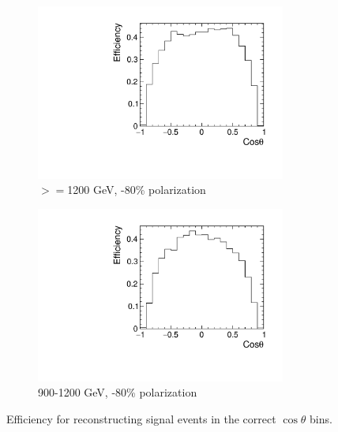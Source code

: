 \begin{figure}
  \centering
  \begin{subfigure}{.5\textwidth}
    \centering
    \includegraphics[width=0.9\textwidth]{TopAnalysis/figures/efficiency_HighE.pdf}
    \caption{$>=$1200 GeV, -80\% polarization}
  \end{subfigure}%
  \begin{subfigure}{.5\textwidth}
    \centering
    \includegraphics[width=0.9\textwidth]{TopAnalysis/figures/efficiency_MidE.pdf}
    \caption{900-1200 GeV, -80\% polarization}
  \end{subfigure}
  \caption{Efficiency for reconstructing signal events in the correct $\cos\theta$ bins.}
  \label{fig:sigefficienciesa}
\end{figure}

